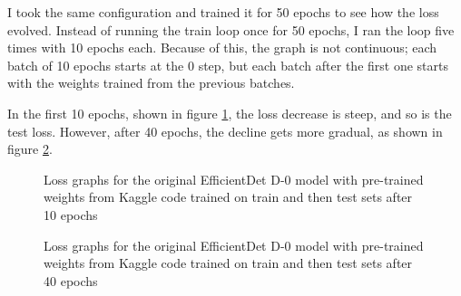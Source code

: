 I took the same configuration and trained it for 50 epochs to see how the loss evolved. Instead of running the train loop once for 50 epochs, I ran the loop five times with 10 epochs each. Because of this, the graph is not continuous; each batch of 10 epochs starts at the 0 step, but each batch after the first one starts with the weights trained from the previous batches.
 
In the first 10 epochs, shown in figure \ref{fig:fig25}, the loss decrease is steep, and so is the test loss. However, after 40 epochs, the decline gets more gradual, as shown in figure \ref{fig:fig26}.

\begin{figure}[H]
    \caption{Loss graphs for the original EfficientDet D-0 model with pre-trained weights from Kaggle code trained on train and then test sets after 10 epochs}
    \label{fig:fig25}
\end{figure}

\begin{figure}[H]
    \caption{Loss graphs for the original EfficientDet D-0 model with pre-trained weights from Kaggle code trained on train and then test sets after 40 epochs}
    \label{fig:fig26}
\end{figure}

